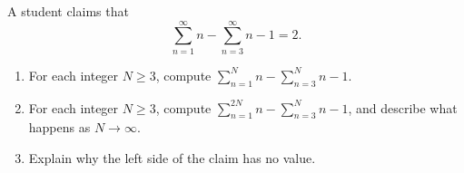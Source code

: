 A student claims that
\[\sum_{n=1}^{\infty}n-\sum_{n=3}^{\infty}n-1=2.\]
\begin{enumerate}
\item[(a)] For each integer $N\ge3$, compute $\displaystyle\sum_{n=1}^{N}n-\sum_{n=3}^{N}n-1$.
\item[(b)] For each integer $N\ge3$, compute $\displaystyle\sum_{n=1}^{2N}n-\sum_{n=3}^{N}n-1$, and describe what happens as $N\to\infty$.
\item[(c)] Explain why the left side of the claim has no value.
\end{enumerate}
